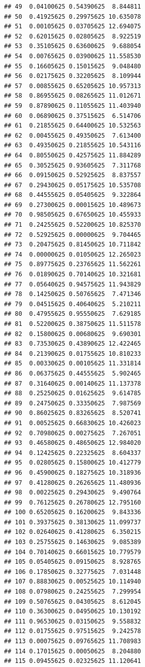 \documentclass[
  12pt,
  a4paper,
  oneside]{book}
\theoremstyle{definition}
\theoremstyle{definition}
\theoremstyle{definition}
\theoremstyle{remark}
\begin{document}
\begin{lstlisting}
## 49  0.04100625 0.54390625  8.844811
## 50  0.41925625 0.29975625 10.635078
## 51  0.00105625 0.03705625 12.694075
## 52  0.62015625 0.02805625  8.922519
## 53  0.35105625 0.63600625  9.688054
## 54  0.00765625 0.03900625 11.558530
## 55  0.16605625 0.15015625  9.048480
## 56  0.02175625 0.32205625  8.109944
## 57  0.00855625 0.65205625 10.957313
## 58  0.86955625 0.08265625 11.012671
## 59  0.87890625 0.11055625 11.403940
## 60  0.06890625 0.37515625  6.514706
## 61  0.21855625 0.64400625 10.532563
## 62  0.00455625 0.49350625  7.613400
## 63  0.49350625 0.21855625 10.543116
## 64  0.80550625 0.42575625 11.884289
## 65  0.30525625 0.93605625  7.311768
## 66  0.09150625 0.52925625  8.837557
## 67  0.29430625 0.05175625 10.535708
## 68  0.44555625 0.05405625  9.322864
## 69  0.27300625 0.00015625 10.489673
## 70  0.98505625 0.67650625 10.455933
## 71  0.24255625 0.52200625 10.825370
## 72  0.52925625 0.00000625  9.704465
## 73  0.20475625 0.81450625 10.711842
## 74  0.00000625 0.01050625 12.265023
## 75  0.89775625 0.23765625 11.562261
## 76  0.01890625 0.70140625 10.321681
## 77  0.05640625 0.94575625 11.943829
## 78  0.14250625 0.50765625  7.471346
## 79  0.04515625 0.40640625  5.210211
## 80  0.47955625 0.95550625  7.629185
## 81  0.52200625 0.38750625 11.511578
## 82  0.15800625 0.00680625  9.690301
## 83  0.73530625 0.43890625 12.422465
## 84  0.21390625 0.01755625 10.810233
## 85  0.00330625 0.00105625 11.331814
## 86  0.06375625 0.44555625  5.902465
## 87  0.31640625 0.00140625 11.137378
## 88  0.25250625 0.01625625  9.614785
## 89  0.24750625 0.33350625  7.987569
## 90  0.86025625 0.83265625  8.520741
## 91  0.00525625 0.66830625 10.426023
## 92  0.70980625 0.00275625  7.267051
## 93  0.46580625 0.48650625 12.984020
## 94  0.12425625 0.22325625  8.604337
## 95  0.02805625 0.15800625 10.412779
## 96  0.45900625 0.18275625 10.318936
## 97  0.41280625 0.26265625 11.480936
## 98  0.00225625 0.29430625  9.490764
## 99  0.76125625 0.26780625 12.795160
## 100 0.65205625 0.16200625  9.843336
## 101 0.39375625 0.38130625 11.099737
## 102 0.02640625 0.41280625  6.350215
## 103 0.25755625 0.14630625  9.085389
## 104 0.70140625 0.66015625 10.779579
## 105 0.05405625 0.09150625  8.928765
## 106 0.17850625 0.32775625  7.031448
## 107 0.88830625 0.00525625 10.114940
## 108 0.07980625 0.24255625  7.299954
## 109 0.50765625 0.04305625  8.612045
## 110 0.36300625 0.04950625 10.130192
## 111 0.96530625 0.03150625  9.558832
## 112 0.01755625 0.97515625  9.242578
## 113 0.00075625 0.09765625 11.708983
## 114 0.17015625 0.00050625  8.204880
## 115 0.09455625 0.02325625 11.120641

\end{lstlisting}
\end{document}
